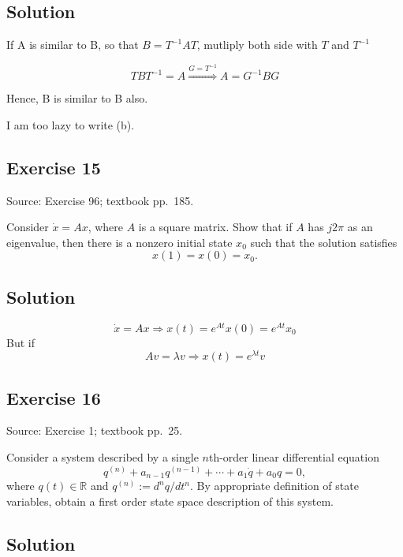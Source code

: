 \documentclass[12pt,a4paper]{article}
\newlength{\questionroom}
\newenvironment{questionprompt}{%
  \begin{lrbox}{\questionbox}\begin{minipage}{\linewidth}%
}{%
  \end{minipage}\end{lrbox}%
  \setlength{\questionroom}{\dimexpr\ht\questionbox+\dp\questionbox+5.2cm\relax}%
  \ifdim\questionroom>\textheight\setlength{\questionroom}{\textheight}\fi
  \Needspace{\questionroom}%
  \noindent\usebox{\questionbox}\par
}
\begin{document}
\subsection*{Solution}

If A is similar to B, so that $B = T^{-1}AT$, mutliply both side with $T$ and $T^{-1}$

\[
TBT^{-1} = A \overset{G = T^{-1}}{\Rightarrow} A = G^{-1} BG 
\]

Hence, B is similar to B also.

I am too lazy to write (b).

\vspace{3.5cm}


\begin{questionprompt}
\section*{Exercise 15}
\label{practice:15}
{\small Source: Exercise 96; textbook pp.~185.}\par
Consider $\dot x=Ax$, where $A$ is a square matrix. Show that if $A$ has $j2\pi$ as an eigenvalue, then there is a nonzero initial state $x_0$ such that the solution satisfies
\[x(1)=x(0)=x_0.\]
\end{questionprompt}
\subsection*{Solution}

\[
\dot x = Ax \Rightarrow x(t) = e^{At} x(0) = e^{At} x_0
\]
But if
\[
Av = \lambda v \Rightarrow x(t) = e^{\lambda t} v
\]


\vspace{3.5cm}


\begin{questionprompt}
\section*{Exercise 16}
\label{practice:16}
{\small Source: Exercise 1; textbook pp.~25.}\par
Consider a system described by a single $n$th-order linear differential equation
\[q^{(n)}+a_{n-1}q^{(n-1)}+\cdots+a_1\dot q+a_0q=0,\]
where $q(t)\in\mathbb R$ and $q^{(n)}:=d^nq/dt^n$. By appropriate definition of state variables, obtain a first order state space description of this system.
\end{questionprompt}
\subsection*{Solution}
\vspace{3.5cm}
\end{document}
